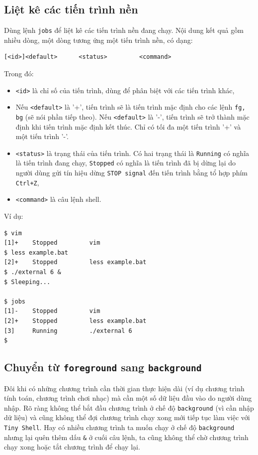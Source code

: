 \documentclass[a4paper,12pt]{report}
\begin{document}
        \subsection{Liệt kê các tiến trình nền}
	    Dùng lệnh \texttt{jobs} để liệt kê các tiến trình nền đang chạy.
	    Nội dung kết quả gồm nhiều dòng, một dòng tương ứng một tiến trình
	    nền, có dạng:
	    \begin{verbatim}
[<id>]<default>      <status>         <command>
	    \end{verbatim}
	    Trong đó:
	    \begin{itemize}
	        \item \texttt{<id>} là chỉ số của tiến trình, dùng để phân biệt
	            với các tiến trình khác,
	        \item Nếu \texttt{<default>} là '+', tiến trình sẽ là tiến
	            trình mặc định cho các lệnh \texttt{fg, bg} (sẽ nói phần
	            tiếp theo). Nếu \texttt{<default>} là '-', tiến trình sẽ
	            trở thành mặc định khi tiến trình mặc định kết thúc. Chỉ có
	            tối đa một tiến trình '+' và một tiến trình '-'.
	        \item \texttt{<status>} là trạng thái của tiến trình. Có hai
	            trạng thái là
	            \texttt{Running} có nghĩa là tiến trình đang chạy,
	            \texttt{Stopped} có nghĩa là tiến trình đã bị dừng lại do
	            người dùng gửi tín hiệu dừng \texttt{STOP signal} đến tiến
	            trình bằng tổ hợp phím \texttt{Ctrl+Z},
	        \item \texttt{<command>} là câu lệnh shell.
	    \end{itemize}
	
	    Ví dụ:
	    \begin{verbatim}
$ vim
[1]+    Stopped         vim
$ less example.bat
[2]+    Stopped         less example.bat
$ ./external 6 &
$ Sleeping...

$ jobs
[1]-    Stopped         vim
[2]+    Stopped         less example.bat
[3]     Running         ./external 6 
$
	    \end{verbatim}
	
        \subsection{Chuyển từ \texttt{foreground} sang
	    \texttt{background}}
	    Đôi khi có những chương trình cần thời gian thực hiện dài (ví
	    dụ chương trình tính toán, chương trình chơi nhạc) mà cần một
	    số dữ liệu đầu vào do người dùng nhập. Rõ ràng không thể bắt
	    đầu chương trình ở chế độ \texttt{background} (vì cần nhập dữ
	    liệu) và cũng không thể đợi chương trình chạy xong mới tiếp tục
	    làm việc với \texttt{Tiny Shell}. Hay có nhiều chương trình ta
	    muốn chạy ở chế độ \texttt{background} nhưng lại quên thêm dấu
	    \texttt{\&} ở cuối câu lệnh, ta cũng không thể chờ chương trình
	    chạy xong hoặc tắt chương trình để chạy lại.\\
	
\end{document}
